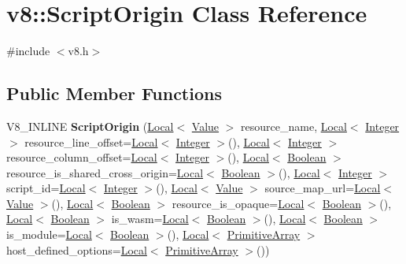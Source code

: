 \hypertarget{classv8_1_1ScriptOrigin}{}\section{v8\+:\+:Script\+Origin Class Reference}
\label{classv8_1_1ScriptOrigin}


{\ttfamily \#include $<$v8.\+h$>$}

\subsection*{Public Member Functions}
\begin{DoxyCompactItemize}
\item 
\mbox{\label{classv8_1_1ScriptOrigin_ac00682bf6cd72a75001bf5f500750700}} 
V8\+\_\+\+I\+N\+L\+I\+NE {\bfseries Script\+Origin} (\mbox{\hyperlink{classv8_1_1Local}{Local}}$<$ \mbox{\hyperlink{classv8_1_1Value}{Value}} $>$ resource\+\_\+name, \mbox{\hyperlink{classv8_1_1Local}{Local}}$<$ \mbox{\hyperlink{classv8_1_1Integer}{Integer}} $>$ resource\+\_\+line\+\_\+offset=\mbox{\hyperlink{classv8_1_1Local}{Local}}$<$ \mbox{\hyperlink{classv8_1_1Integer}{Integer}} $>$(), \mbox{\hyperlink{classv8_1_1Local}{Local}}$<$ \mbox{\hyperlink{classv8_1_1Integer}{Integer}} $>$ resource\+\_\+column\+\_\+offset=\mbox{\hyperlink{classv8_1_1Local}{Local}}$<$ \mbox{\hyperlink{classv8_1_1Integer}{Integer}} $>$(), \mbox{\hyperlink{classv8_1_1Local}{Local}}$<$ \mbox{\hyperlink{classv8_1_1Boolean}{Boolean}} $>$ resource\+\_\+is\+\_\+shared\+\_\+cross\+\_\+origin=\mbox{\hyperlink{classv8_1_1Local}{Local}}$<$ \mbox{\hyperlink{classv8_1_1Boolean}{Boolean}} $>$(), \mbox{\hyperlink{classv8_1_1Local}{Local}}$<$ \mbox{\hyperlink{classv8_1_1Integer}{Integer}} $>$ script\+\_\+id=\mbox{\hyperlink{classv8_1_1Local}{Local}}$<$ \mbox{\hyperlink{classv8_1_1Integer}{Integer}} $>$(), \mbox{\hyperlink{classv8_1_1Local}{Local}}$<$ \mbox{\hyperlink{classv8_1_1Value}{Value}} $>$ source\+\_\+map\+\_\+url=\mbox{\hyperlink{classv8_1_1Local}{Local}}$<$ \mbox{\hyperlink{classv8_1_1Value}{Value}} $>$(), \mbox{\hyperlink{classv8_1_1Local}{Local}}$<$ \mbox{\hyperlink{classv8_1_1Boolean}{Boolean}} $>$ resource\+\_\+is\+\_\+opaque=\mbox{\hyperlink{classv8_1_1Local}{Local}}$<$ \mbox{\hyperlink{classv8_1_1Boolean}{Boolean}} $>$(), \mbox{\hyperlink{classv8_1_1Local}{Local}}$<$ \mbox{\hyperlink{classv8_1_1Boolean}{Boolean}} $>$ is\+\_\+wasm=\mbox{\hyperlink{classv8_1_1Local}{Local}}$<$ \mbox{\hyperlink{classv8_1_1Boolean}{Boolean}} $>$(), \mbox{\hyperlink{classv8_1_1Local}{Local}}$<$ \mbox{\hyperlink{classv8_1_1Boolean}{Boolean}} $>$ is\+\_\+module=\mbox{\hyperlink{classv8_1_1Local}{Local}}$<$ \mbox{\hyperlink{classv8_1_1Boolean}{Boolean}} $>$(), \mbox{\hyperlink{classv8_1_1Local}{Local}}$<$ \mbox{\hyperlink{classv8_1_1PrimitiveArray}{Primitive\+Array}} $>$ host\+\_\+defined\+\_\+options=\mbox{\hyperlink{classv8_1_1Local}{Local}}$<$ \mbox{\hyperlink{classv8_1_1PrimitiveArray}{Primitive\+Array}} $>$())

\end{DoxyCompactItemize}
